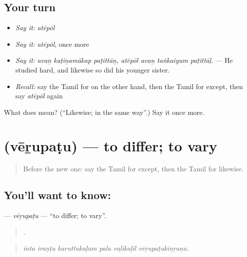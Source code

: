 \subsection*{Your turn}
\begin{itemize}
\raggedright
  \item \emph{Say it:} \emph{atēpōl}
  \item \emph{Say it:} \emph{atēpōl}, once more
  \item \emph{Say it:} \emph{avaṉ kaṭiṉamākap paṭittāṉ, atēpōl avaṉ taṅkaiyum paṭittāḷ.} — He studied hard, and likewise so did his younger sister.
  \item \emph{Recall:} say the Tamil for on the other hand, then the Tamil for except, then say \emph{atēpōl} again
\end{itemize}

\begin{tcolorbox}[breakable,colback=teal!4,colframe=teal!35!black,title={Before you move on}]
What does  mean? (\textquotedblleft{}Likewise; in the same way\textquotedblright{}.) Say it once more.
\end{tcolorbox}
\section[\texorpdfstring{\ta{வேறுபடு} (vēṟupaṭu)}{வேறுபடு (vēṟupaṭu)}]{ (vēṟupaṭu) — to differ; to vary}

\label{lesson:TA-C357-verupatu}



\begin{quote}
Before the new one: say the Tamil for except, then the Tamil for likewise.
\end{quote}

\subsection*{You'll want to know: }
\textbf{} — \emph{vēṟupaṭu} — \textquotedblleft{}to differ; to vary\textquotedblright{}.

\begin{quote}
     .
\end{quote}

\begin{quote}
\emph{inta iraṇṭu karuttukaḷum pala vaḻikaḷil vēṟupaṭukiṉṟaṉa.}
\end{quote}

